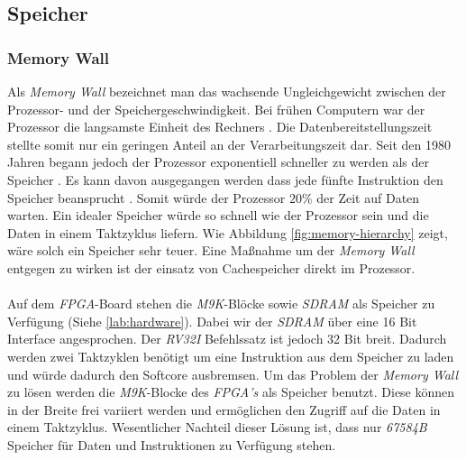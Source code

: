         \subsection{Speicher}
                
            \subsubsection{Memory Wall}
                Als \textit{Memory Wall} bezeichnet man das wachsende Ungleichgewicht zwischen der Prozessor- und der Speichergeschwindigkeit.
                Bei frühen Computern war der Prozessor die langsamste Einheit des Rechners \cite{memory-wall}.
                Die Datenbereitstellungszeit stellte somit nur ein geringen Anteil an der Verarbeitungszeit dar.
                Seit den 1980 Jahren begann jedoch der Prozessor exponentiell schneller zu werden als der Speicher \cite{memory-cpu-gap}.
                Es kann davon ausgegangen werden dass jede fünfte Instruktion den Speicher beansprucht \cite{memory-wall}.
                Somit würde der Prozessor $20\%$ der Zeit auf Daten warten. Ein idealer Speicher würde so schnell wie der Prozessor sein
                und die Daten in einem Taktzyklus liefern.
                Wie Abbildung \ref{fig:memory-hierarchy} zeigt, wäre solch ein Speicher sehr teuer.
                Eine Maßnahme um der \textit{Memory Wall} entgegen zu wirken ist der einsatz von Cachespeicher direkt im Prozessor.
                \\\\
                Auf dem \textit{FPGA}-Board stehen die \textit{M9K}-Blöcke sowie \textit{SDRAM} als Speicher zu Verfügung (Siehe \ref{lab:hardware}).
                Dabei wir der \textit{SDRAM} über eine 16 Bit Interface angesprochen. Der \textit{RV32I} Befehlssatz ist jedoch 32 Bit breit.
                Dadurch werden zwei Taktzyklen benötigt um eine Instruktion aus dem Speicher zu laden und würde dadurch den Softcore ausbremsen.
                Um das Problem der \textit{Memory Wall} zu lösen werden die \textit{M9K}-Blocke des \textit{FPGA's} als Speicher benutzt.
                Diese können in der Breite frei variiert werden und ermöglichen den Zugriff auf die Daten in einem Taktzyklus.
                Wesentlicher Nachteil dieser Lösung ist, dass nur \textit{67584B} Speicher für Daten und Instruktionen zu Verfügung stehen.
                

